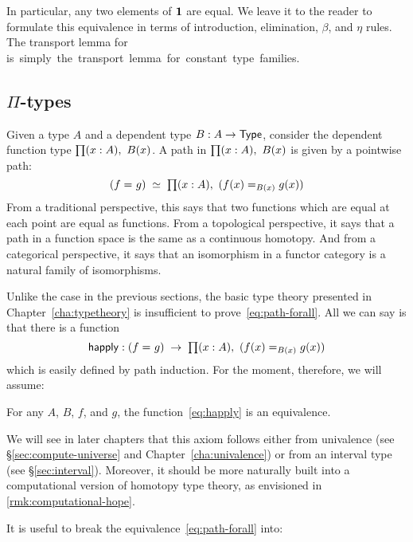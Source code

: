 In particular, any two elements of $\mathbf{1}$ are equal.
We leave it to the reader to formulate this equivalence in terms of introduction, elimination, $\beta$, and $\eta$ rules.
The transport lemma for \unit is simply the transport lemma for constant type families.


\subsection{$\Pi$-types}
\label{sec:compute-pi}

Given a type $A$ and a dependent type $B : A \to \mathsf{Type}$, consider the dependent function type $\prd{x:A}B(x)$.
A path in $\prd{x:A} B(x)$ is given by a pointwise path:
\begin{equation}
  \eqvspaced{(\id{f}{g})}{\prd{x:A} (\id[B(x)]{f(x)}{g(x)})}\label{eq:path-forall}
\end{equation}
From a traditional perspective, this says that two functions which are equal at each point are equal as functions.
From a topological perspective, it says that a path in a function space is the same as a continuous homotopy.
And from a categorical perspective, it says that an isomorphism in a functor category is a natural family of isomorphisms.

Unlike the case in the previous sections, the basic type theory presented in Chapter~\ref{cha:typetheory} is insufficient to prove~\eqref{eq:path-forall}.
All we can say is that there is a function
\begin{equation}
  \happly : {(\id{f}{g})}\;\to\; {\prd{x:A} (\id[B(x)]{f(x)}{g(x)})}\label{eq:happly}
\end{equation}
which is easily defined by path induction.
For the moment, therefore, we will assume:

\begin{axiom}
  For any $A$, $B$, $f$, and $g$, the function~\eqref{eq:happly} is an equivalence.
\end{axiom}

We will see in later chapters that this axiom follows either from univalence (see \S\ref{sec:compute-universe} and Chapter~\ref{cha:univalence}) or from an interval type (see \S\ref{sec:interval}).
Moreover, it should be more naturally built into a computational version of homotopy type theory, as envisioned in \autoref{rmk:computational-hope}.

It is useful to break the equivalence~\eqref{eq:path-forall} into:


